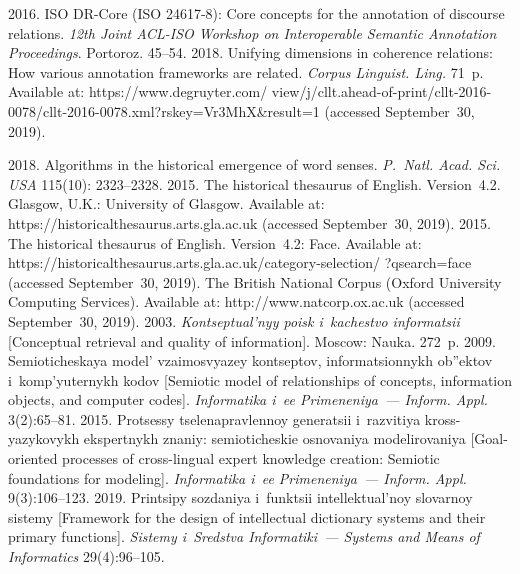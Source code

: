 \begin{multicols}{2}
{{\begin{thebibliography}{99}
 2016. ISO DR-Core (ISO \mbox{24617-8}): Core concepts for 
the annotation of discourse relations. \textit{12th Joint ACL-ISO Workshop on 
Interoperable Semantic Annotation Proceedings}. Portoroz. 45--54.
 2018. Unifying 
dimensions in coherence relations: How various annotation frameworks are 
related. \textit{Corpus Linguist. Ling.} 71~p. Available at: {\sf 
https://www.degruyter.com/ view/j/cllt.ahead-of-print/cllt-2016-0078/cllt-2016-0078.xml?rskey=Vr3MhX\&result=1} (accessed 
September~30, 2019).

 2018. Algorithms in the 
historical emergence of word senses. \textit{P.~Natl. Acad. Sci. USA} 115(10): 2323--2328.
 2015. 
The historical thesaurus of English. Version~4.2.
Glasgow, U.K.: University of Glasgow.
 Available at: {\sf 
https://historicalthesaurus.arts.gla.ac.uk} (accessed September~30, 2019).
 2015. 
The historical thesaurus of English. Version~4.2: Face. Available at: {\sf 
https://\linebreak  historicalthesaurus.arts.gla.ac.uk/category-selection/ ?qsearch=face} (accessed 
September~30, 2019).
The British National Corpus (Oxford University Computing Services). Available at: 
{\sf http://www.natcorp.ox.ac.uk} (accessed September~30, 2019).
 2003. \textit{Kontseptual'nyy poisk i~kachestvo informatsii} 
[Conceptual retrieval and quality of information]. Moscow: Nauka. 272~p.
 2009. Semioticheskaya model' vzaimosvyazey kontseptov, 
informatsionnykh ob''ektov i~komp'yuternykh kodov [Semiotic model of 
relationships of concepts, information objects, and computer codes]. 
\textit{Informatika i~ee Primeneniya~--- Inform. Appl.} 3(2):65--81.
 2015. Protsessy tselenapravlennoy generatsii i~razvitiya  
kross-yazykovykh ekspertnykh znaniy: semioticheskie osnovaniya modelirovaniya 
[Goal-oriented processes of cross-lingual expert knowledge creation: Semiotic 
foundations for modeling]. \textit{Informatika i~ee Primeneniya~--- Inform. Appl.} 
9(3):106--123.
 2019. Printsipy sozdaniya i~funktsii 
intellektual'noy slovarnoy sistemy [Framework for the design of intellectual 
dictionary systems and their primary functions]. \textit{Sistemy i~Sredstva 
Informatiki~--- Systems and Means of Informatics} 29(4):96--105.


\end{thebibliography}}}
\end{multicols}
